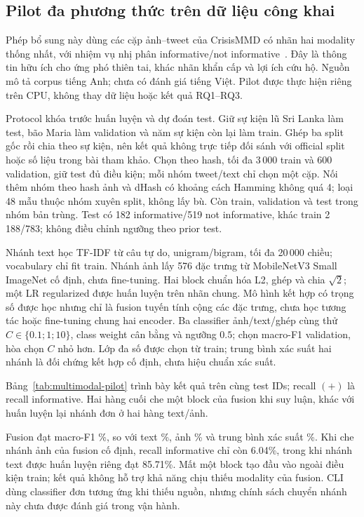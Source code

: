 \subsection{Pilot đa phương thức trên dữ liệu công khai}\label{sec:multimodal-pilot}
Phép bổ sung này dùng các cặp ảnh--tweet của CrisisMMD có nhãn hai modality thống nhất, với nhiệm vụ nhị phân informative/not informative~\cite{alam2018crisismmd,ofli2020multimodal}. Đây là thông tin hữu ích cho ứng phó thiên tai, khác nhãn khẩn cấp và lợi ích cứu hộ. Nguồn mô tả corpus tiếng Anh; chưa có đánh giá tiếng Việt. Pilot được thực hiện riêng trên CPU, không thay dữ liệu hoặc kết quả RQ1--RQ3.

Protocol khóa trước huấn luyện và dự đoán test. Giữ sự kiện lũ Sri Lanka làm test, bão Maria làm validation và năm sự kiện còn lại làm train. Ghép ba split gốc rồi chia theo sự kiện, nên kết quả không trực tiếp đối sánh với official split hoặc số liệu trong bài tham khảo. Chọn theo hash, tối đa 3\,000 train và 600 validation, giữ test đủ điều kiện; mỗi nhóm tweet/text chỉ chọn một cặp. Nối thêm nhóm theo hash ảnh và dHash có khoảng cách Hamming không quá 4; loại 48 mẫu thuộc nhóm xuyên split, không lấy bù. Còn \MMTrainN{} train, \MMDevN{} validation và \MMTestN{} test trong \MMTestGroups{} nhóm bản trùng. Test có 182 informative/519 not informative, khác train 2\,188/783; không điều chỉnh ngưỡng theo prior test.

Nhánh text học TF-IDF từ câu tự do, unigram/bigram, tối đa 20\,000 chiều; vocabulary chỉ fit train. Nhánh ảnh lấy 576 đặc trưng từ MobileNetV3 Small ImageNet cố định, chưa fine-tuning. Hai block chuẩn hóa L2, ghép và chia $\sqrt{2}$; một LR regularized được huấn luyện trên nhãn chung. Mô hình kết hợp có trọng số được học nhưng chỉ là fusion tuyến tính cộng các đặc trưng, chưa học tương tác hoặc fine-tuning chung hai encoder. Ba classifier ảnh/text/ghép cùng thử $C\in\{0.1;1;10\}$, class weight cân bằng và ngưỡng $0.5$; chọn macro-F1 validation, hòa chọn $C$ nhỏ hơn. Lớp đa số được chọn từ train; trung bình xác suất hai nhánh là đối chứng kết hợp cố định, chưa hiệu chuẩn xác suất.

Bảng~\ref{tab:multimodal-pilot} trình bày kết quả trên cùng test IDs; recall $(+)$ là recall informative. Hai hàng cuối che một block của fusion khi suy luận, khác với huấn luyện lại nhánh đơn ở hai hàng text/ảnh.



Fusion đạt macro-F1 \MMFusionFOne\%, so với text \MMTextFOne\%, ảnh \MMImageFOne\% và trung bình xác suất \MMMeanFOne\%. Khi che nhánh ảnh của fusion cố định, recall informative chỉ còn 6.04\%, trong khi nhánh text được huấn luyện riêng đạt 85.71\%. Mất một block tạo đầu vào ngoài điều kiện train; kết quả không hỗ trợ khả năng chịu thiếu modality của fusion. CLI dùng classifier đơn tương ứng khi thiếu nguồn, nhưng chính sách chuyển nhánh này chưa được đánh giá trong vận hành.

